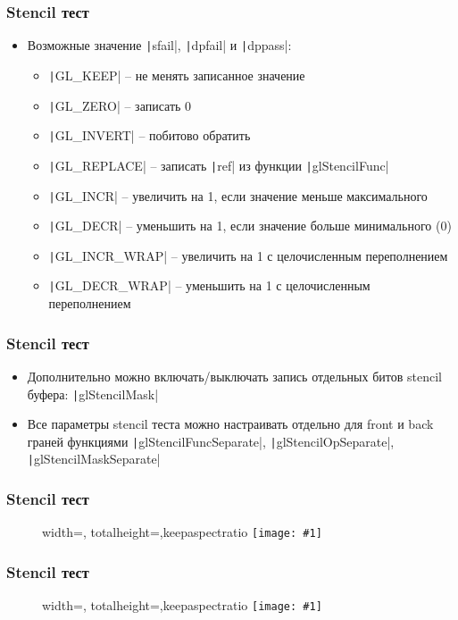 \documentclass[10pt]{beamer}
\newcommand{\slideimage}[1]{
  \begin{figure}
    \begin{adjustbox}{width=\textwidth, totalheight=\textheight-2\baselineskip-2\baselineskip,keepaspectratio}
      \texttt{[image: \#1]}
    \end{adjustbox}
  \end{figure}
}
\begin{document}
\begin{frame}[fragile]
\frametitle{Stencil тест}
\begin{itemize}
\item Возможные значение \texttt|sfail|, \texttt|dpfail| и \texttt|dppass|:
\begin{itemize}
\item \texttt|GL_KEEP| -- не менять записанное значение
\item \texttt|GL_ZERO| -- записать 0
\item \texttt|GL_INVERT| -- побитово обратить
\item \texttt|GL_REPLACE| -- записать \texttt|ref| из функции \texttt|glStencilFunc|
\item \texttt|GL_INCR| -- увеличить на 1, если значение меньше максимального
\item \texttt|GL_DECR| -- уменьшить на 1, если значение больше минимального (0)
\item \texttt|GL_INCR_WRAP| -- увеличить на 1 с целочисленным переполнением
\item \texttt|GL_DECR_WRAP| -- уменьшить на 1 с целочисленным переполнением
\end{itemize}
\end{itemize}
\end{frame}

\begin{frame}[fragile]
\frametitle{Stencil тест}
\begin{itemize}
\item Дополнительно можно включать/выключать запись отдельных битов stencil буфера: \texttt|glStencilMask|
\pause
\item Все параметры stencil теста можно настраивать отдельно для front и back граней функциями \texttt|glStencilFuncSeparate|, \texttt|glStencilOpSeparate|, \texttt|glStencilMaskSeparate|
\end{itemize}
\end{frame}

\begin{frame}[fragile]
\frametitle{Stencil тест}
\slideimage{stencil-example-1.png}
\end{frame}

\begin{frame}[fragile]
\frametitle{Stencil тест}
\slideimage{stencil-example-2.png}
\end{frame}
\end{document}
